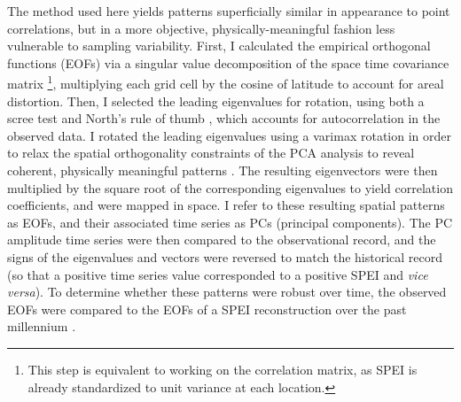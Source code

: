 \documentclass[10pt]{iopart}
\begin{document}
The method used here yields patterns superficially similar in appearance to point correlations, but in a more objective, physically-meaningful fashion less vulnerable to sampling variability. First, I calculated the empirical orthogonal functions (EOFs) via a singular value decomposition of the space time covariance matrix \footnote{This step is equivalent to working on the correlation matrix, as SPEI is already standardized to unit variance at each location.}, multiplying each grid cell by the cosine of latitude to account for areal distortion. Then, I selected the leading eigenvalues for rotation, using both a scree test and North's rule of thumb \parencite{North1982}, which accounts for autocorrelation in the observed data. I rotated the leading eigenvalues using a varimax rotation in order to relax the spatial orthogonality constraints of the PCA analysis to reveal coherent, physically meaningful patterns \parencite{Richman1986}. The resulting eigenvectors were then multiplied by the square root of the corresponding eigenvalues to yield correlation coefficients, and were mapped in space. I refer to these resulting spatial patterns as EOFs, and their associated time series as PCs (principal components). The PC amplitude time series were then compared to the observational record, and the signs of the eigenvalues and vectors were reversed to match the historical record (so that a positive time series value corresponded to a positive SPEI and \textit{vice versa}). To determine whether these patterns were robust over time, the observed EOFs were compared to the EOFs of a SPEI reconstruction over the past millennium \parencite{Steiger2018}.
\end{document}
